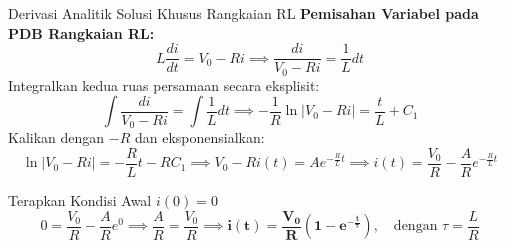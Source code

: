 \documentclass[aspectratio=169,10pt]{beamer}
\begin{document}
\begin{frame}{Derivasi Analitik Solusi Khusus Rangkaian RL}
  \textbf{Pemisahan Variabel pada PDB Rangkaian RL:}
  \begin{equation*}
    L \frac{di}{dt} = V_0 - R i \implies \frac{di}{V_0 - R i} = \frac{1}{L} dt
  \end{equation*}
  Integralkan kedua ruas persamaan secara eksplisit:
  \begin{equation*}
    \int \frac{di}{V_0 - R i} = \int \frac{1}{L} dt \implies -\frac{1}{R} \ln |V_0 - R i| = \frac{t}{L} + C_1
  \end{equation*}
  Kalikan dengan $-R$ dan eksponensialkan:
  \begin{equation*}
    \ln |V_0 - R i| = -\frac{R}{L} t - R C_1 \implies V_0 - R i(t) = A e^{-\frac{R}{L} t} \implies i(t) = \frac{V_0}{R} - \frac{A}{R} e^{-\frac{R}{L} t}
  \end{equation*}
  \begin{exampleblock}{Terapkan Kondisi Awal $i(0) = 0$}
    \begin{equation*}
      0 = \frac{V_0}{R} - \frac{A}{R} e^0 \implies \frac{A}{R} = \frac{V_0}{R} \implies \mathbf{i(t) = \frac{V_0}{R} \left(1 - e^{-\frac{t}{\tau}}\right)}, \quad \text{dengan } \tau = \frac{L}{R}
    \end{equation*}
  \end{exampleblock}
\end{frame}
\end{document}
